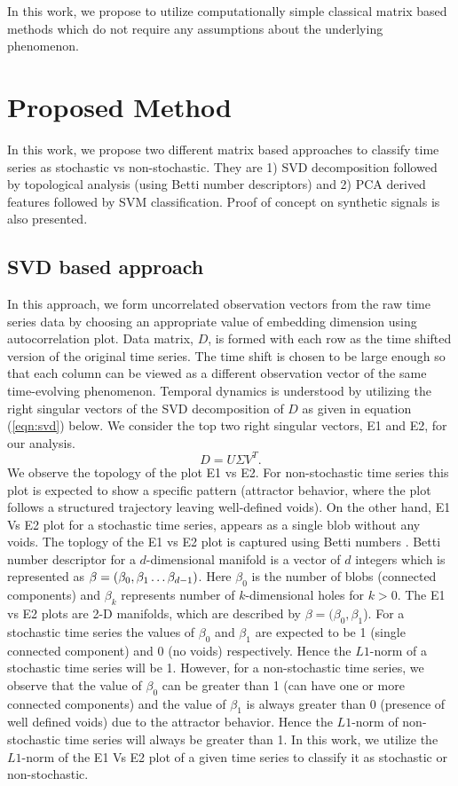 \documentclass[journal]{IEEEtran}
\begin{document}
	In this work, we propose to utilize computationally simple classical matrix based methods which do not require any assumptions about the underlying phenomenon.
	
	\section{Proposed Method}
	
	In this work, we propose two different  matrix based approaches to classify time series as stochastic vs non-stochastic. They are 1) SVD decomposition followed by topological analysis (using Betti number descriptors) and 2) PCA derived features followed by SVM classification. Proof of concept on synthetic signals is also presented.
	
	\subsection{SVD based approach}
	In this approach, we form uncorrelated observation vectors from the raw time series data  by choosing an appropriate value of embedding dimension \cite{misra2006} using autocorrelation plot. Data matrix, $D$, is formed with each row  as the  time shifted version of the original time series. The time shift is chosen to be large enough so that each column can be viewed as a different observation vector of the same time-evolving phenomenon. Temporal dynamics is understood by utilizing the right singular vectors of the SVD decomposition of $D$ as given in equation (\ref{eqn:svd}) below. We consider the top two right singular vectors, E1 and E2, for our analysis.
	\begin{equation}
		D = U \Sigma V^T.
		\label{eqn:svd}
	\end{equation}
	We observe the topology of the plot E1 vs E2. For non-stochastic time series this plot is expected to show a specific pattern (attractor behavior, where the plot follows a structured trajectory leaving  well-defined voids). On the other hand, E1 Vs E2 plot for a stochastic time series, appears as a single blob without any voids. The toplogy of the E1 vs E2 plot is  captured using Betti numbers \cite{jmlr}. Betti number descriptor for a $d$-dimensional manifold is a vector of $d$ integers which is represented as $\beta = (\beta_0, \beta_1 \mathellipsis \beta_{d-1})$. Here $\beta_{0}$ is the number of blobs (connected components) and $\beta_k$ represents number of $k$-dimensional holes for $k>0$.  The E1 vs E2 plots are 2-D manifolds, which are described by  $\beta=(\beta_{0}, \beta_{1}$). For a stochastic time series the values of $\beta_{0}$  and $\beta_1$ are expected to be 1 (single connected component) and 0 (no voids) respectively. Hence the $L1$-norm of a stochastic time series will be 1. However, for a non-stochastic time series, we observe that the value of $\beta_{0}$ can be greater than 1 (can have one or more connected components) and the value of $\beta_1$ is always greater than 0 (presence of well defined voids) due to the attractor behavior. Hence the $L1$-norm of non-stochastic time series will always be greater than 1. In this work, we utilize the $L1$-norm of the E1 Vs E2 plot of a given time series to classify it as stochastic or non-stochastic.
	
\end{document}
